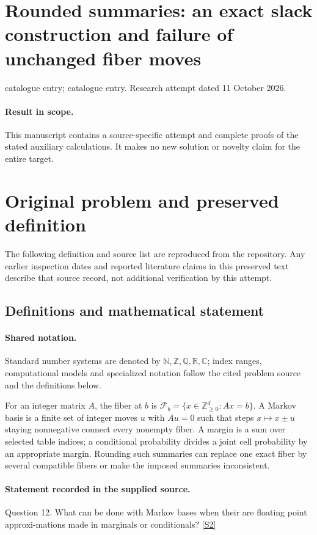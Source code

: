 \documentclass[11pt]{article}
\begin{document}
\section*{Rounded summaries: an exact slack construction and failure of unchanged fiber moves}
\noindent catalogue entry; catalogue entry. Research attempt dated 11 October 2026.
\paragraph{Result in scope.}This manuscript contains a source-specific attempt and complete proofs of the stated auxiliary calculations. It makes no new solution or novelty claim for the entire target.
\section{Original problem and preserved definition}
The following definition and source list are reproduced from the repository. Any earlier inspection dates and reported literature claims in this preserved text describe that source record, not additional verification by this attempt.
\subsection{Definitions and mathematical statement}

\paragraph{Shared notation.}Standard number systems are denoted by $\mathbb N,\mathbb Z,\mathbb Q,\mathbb R,\mathbb C$; index ranges, computational models and specialized notation follow the cited problem source and the definitions below.


For an integer matrix $A$, the fiber at $b$ is $\mathcal F_b=\{x\in\mathbb Z_{\ge0}^d:Ax=b\}$. A Markov basis is a finite set of integer moves $u$ with $Au=0$ such that steps $x\mapsto x\pm u$ staying nonnegative connect every nonempty fiber. A margin is a sum over selected table indices; a conditional probability divides a joint cell probability by an appropriate margin. Rounding such summaries can replace one exact fiber by several compatible fibers or make the imposed summaries inconsistent.
\paragraph{Statement recorded in the supplied source.}
Question 12. What can be done with Markov bases when their are floating point approxi-mations made in marginals or conditionals? \href{https://aimath.org/WWN/compalgstat/compalgstat.pdf}{[S2]}
\end{document}
